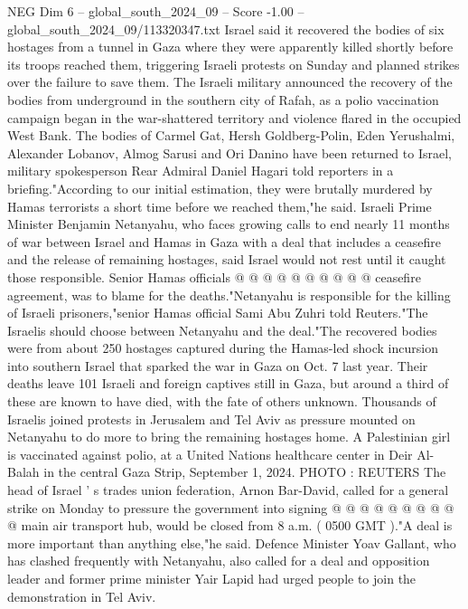 \begin{textsample}{NEG Dim 6 – global\_south\_2024\_09 – Score -1.00 – global\_south\_2024\_09/113320347.txt}  \label{ex:f6_neg_015}
Israel said it recovered the bodies of six hostages from a tunnel in Gaza where they were apparently killed shortly before its troops reached them, triggering Israeli protests on Sunday and planned strikes over the failure to save them.
The Israeli military announced the recovery of the bodies from underground in the southern city of Rafah, as a polio vaccination campaign began in the war-shattered territory and violence flared in the occupied West Bank.
The bodies of Carmel Gat, Hersh Goldberg-Polin, Eden Yerushalmi, Alexander Lobanov, Almog Sarusi and Ori Danino have been returned to Israel, military spokesperson Rear Admiral Daniel Hagari told reporters in a briefing."According to our initial estimation, they were brutally murdered by Hamas terrorists a short time before we reached them,"he said.
Israeli Prime Minister Benjamin Netanyahu, who faces growing calls to end nearly 11 months of war between Israel and Hamas in Gaza with a deal that includes a ceasefire and the release of remaining hostages, said Israel would not rest until it caught those responsible.
Senior Hamas officials @ @ @ @ @ @ @ @ @ @ ceasefire agreement, was to blame for the deaths."Netanyahu is responsible for the killing of Israeli prisoners,"senior Hamas official Sami Abu Zuhri told Reuters."The Israelis should choose between Netanyahu and the deal."The recovered bodies were from about 250 hostages captured during the Hamas-led shock incursion into southern Israel that sparked the war in Gaza on Oct. 7 last year.
Their deaths leave 101 Israeli and foreign captives still in Gaza, but around a third of these are known to have died, with the fate of others unknown.
Thousands of Israelis joined protests in Jerusalem and Tel Aviv as pressure mounted on Netanyahu to do more to bring the remaining hostages home.
A Palestinian girl is vaccinated against polio, at a United Nations healthcare center in Deir Al-Balah in the central Gaza Strip, September 1, 2024.
PHOTO : REUTERS The head of Israel ' s trades union federation, Arnon Bar-David, called for a general strike on Monday to pressure the government into signing @ @ @ @ @ @ @ @ @ @ main air transport hub, would be closed from 8 a.m. ( 0500 GMT )."A deal is more important than anything else,"he said.
Defence Minister Yoav Gallant, who has clashed frequently with Netanyahu, also called for a deal and opposition leader and former prime minister Yair Lapid had urged people to join the demonstration in Tel Aviv.

\end{textsample}
